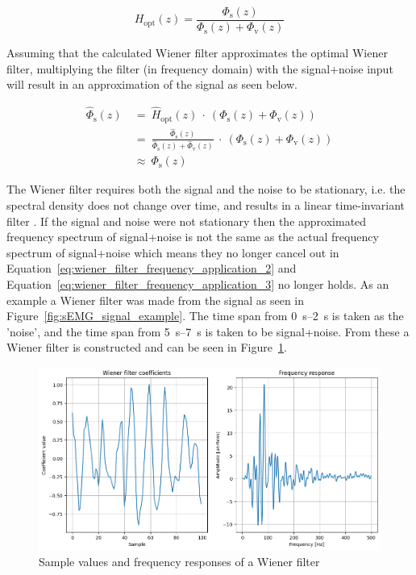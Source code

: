 \begin{equation}
    H_\text{opt}(z) = \frac{\Phi_\text{s}(z)}{\Phi_\text{s}(z) + \Phi_\text{v}(z)}
    \label{eq:wiener_filter_frequency_behaviour}
\end{equation}

Assuming that the calculated Wiener filter approximates the optimal Wiener filter, multiplying the filter (in frequency domain) with the signal+noise input will result in an approximation of the signal as seen below.

\begin{align}
    \hat{\Phi}_\text{s}(z) & \ = \ \hat{H}_\text{opt}(z) \ \cdot \ \left(\Phi_\text{s}(z) + \Phi_\text{v}(z)\right) \label{eq:wiener_filter_frequency_application_1} \\
    & \ = \ \frac{\hat{\Phi}_\text{s}(z)}{\hat{\Phi}_\text{s}(z) + \hat{\Phi}_\text{v}(z)} \ \cdot \ \left(\Phi_\text{s}(z) + \Phi_\text{v}(z)\right) \label{eq:wiener_filter_frequency_application_2}\\
    & \ \approx \ \Phi_\text{s}(z) \label{eq:wiener_filter_frequency_application_3}
\end{align}

The Wiener filter requires both the signal and the noise to be stationary, i.e. the spectral density does not change over time, and results in a linear time-invariant filter \cite{stationary_processes_definition} \cite{difference_stationary_nonstationary}. If the signal and noise were not stationary then the approximated frequency spectrum of signal+noise is not the same as the actual frequency spectrum of signal+noise which means they no longer cancel out in Equation~\ref{eq:wiener_filter_frequency_application_2} and Equation~\ref{eq:wiener_filter_frequency_application_3} no longer holds.
As an example a Wiener filter was made from the signal as seen in Figure~\ref{fig:sEMG_signal_example}. The time span from \SIrange{0}{2}{\second} is taken as the 'noise', and the time span from \SIrange{5}{7}{\second} is taken to be signal+noise. From these a Wiener filter is constructed and can be seen in Figure~\ref{fig:wiener_filter_response}.

\begin{figure}[h!t]
	\begin{center}
		\includegraphics[width=1.0\columnwidth]{images/wiener_filter_response.png}
	\end{center}
	\caption{Sample values and frequency responses of a Wiener filter}
	\label{fig:wiener_filter_response}
\end{figure}

